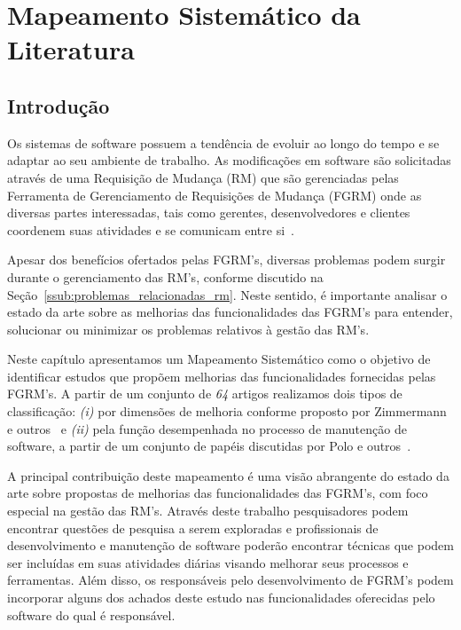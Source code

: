 
\chapter{Mapeamento Sistemático da Literatura}
\label{ch:mapeamento-sistematico}

\section{Introdução}
\label{sec:map-intro}

Os sistemas de software possuem a tendência de evoluir ao longo do tempo e se
adaptar ao seu ambiente de trabalho. As modificações em software são solicitadas
através de uma Requisição de Mudança (RM) que são gerenciadas pelas Ferramenta
de Ge\-ren\-ci\-a\-men\-to de Requisições de Mudança (FGRM) onde as diversas
partes interessadas, tais como gerentes, desenvolvedores e clientes coordenem
suas atividades e se comunicam entre si~\cite{bertram2010communication}.

Apesar dos benefícios ofertados pelas FGRM's, diversas problemas podem surgir
durante o gerenciamento das RM's, conforme discutido na
Seção~\ref{ssub:problemas_relacionadas_rm}. Neste sentido, é importante analisar
o estado da arte sobre as melhorias das fun\-ci\-o\-na\-li\-da\-des das FGRM's
para entender, solucionar ou minimizar os problemas relativos à gestão das RM's.

Neste capítulo apresentamos um Mapeamento Sistemático como o objetivo de
identificar estudos que propõem melhorias das funcionalidades fornecidas pelas
FGRM's. A partir de um conjunto de \textit{64} artigos realizamos dois tipos de
classificação: \textit{(i)} por dimensões de melhoria conforme proposto
por Zimmermann e outros~\cite{zimmermann2009improving} e \textit{(ii)} pela
função desempenhada no processo de manutenção de software, a partir de um
conjunto de papéis discutidas por Polo e outros~\cite{Polo1999}.

A principal contribuição deste mapeamento é uma visão abrangente do estado da
arte sobre propostas de melhorias das funcionalidades das FGRM's, com foco
especial na gestão das RM's. Através deste trabalho pesquisadores podem
encontrar questões de pesquisa a serem exploradas e profissionais de
desenvolvimento e manutenção de software poderão encontrar técnicas que podem
ser incluídas em suas atividades diárias visando melhorar seus processos e
ferramentas. Além disso, os responsáveis pelo desenvolvimento de FGRM's podem
incorporar alguns dos achados deste estudo nas funcionalidades oferecidas pelo
software do qual é responsável.

